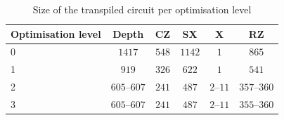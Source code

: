 \begin{table}[htbp]
\centering
\caption{Size of the transpiled circuit per optimisation level}
\label{tab:exp1_transpiled}
\begin{tabular}{@{}l*{5}{c}@{}}
\toprule
Optimisation level & Depth & CZ & SX & X & RZ \\
\midrule
0 & $1417$ & $548$ & $1142$ & $1$ & $865$ \\
1 & $919$ & $326$ & $622$ & $1$ & $541$ \\
2 & $605$--$607$ & $241$ & $487$ & $2$--$11$ & $357$--$360$ \\
3 & $605$--$607$ & $241$ & $487$ & $2$--$11$ & $355$--$360$ \\
\bottomrule
\end{tabular}
\end{table}

